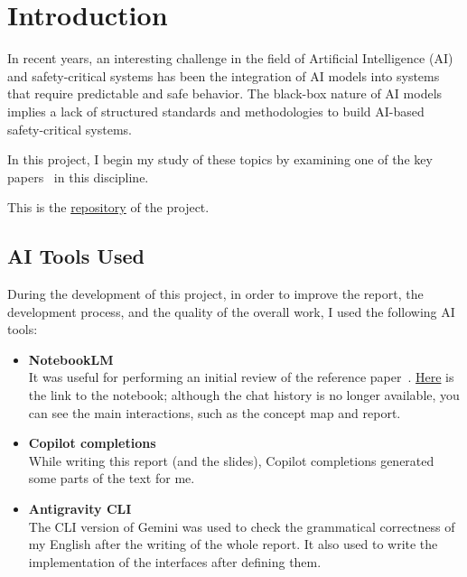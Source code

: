 \chapter{Introduction}
In recent years, an interesting challenge in the field of Artificial Intelligence (AI) and safety-critical systems has been the integration of AI models into systems that require predictable and safe behavior. The black-box nature of AI models implies a lack of structured standards and methodologies to build AI-based safety-critical systems.

In this project, I begin my study of these topics by examining one of the key papers~\cite{perez2024artificial} in this discipline.

\myskip

This is the \href{https://github.com/edoardosarri24/AI-Safety-Critical-runtime-monitoring}{repository} of the project.

\section{AI Tools Used}
During the development of this project, in order to improve the report, the development process, and the quality of the overall work, I used the following AI tools:
\begin{itemize}
    \item \textbf{NotebookLM} \\
        It was useful for performing an initial review of the reference paper~\cite{perez2024artificial}. \href{https://notebooklm.google.com/notebook/26530d12-ce92-4268-a231-5d9a3e5e7358}{Here} is the link to the notebook; although the chat history is no longer available, you can see the main interactions, such as the concept map and report.
    \item \textbf{Copilot completions} \\
        While writing this report (and the slides), Copilot completions generated some parts of the text for me.
    \item \textbf{Antigravity CLI} \\
        The CLI version of Gemini was used to check the grammatical correctness of my English after the writing of the whole report. It also used to write the implementation of the interfaces after defining them.
\end{itemize}

